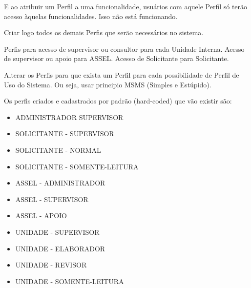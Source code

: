 E ao atribuir um Perfil a uma funcionalidade, usuários com aquele Perfil só terão acesso àquelas funcionalidades. Isso não está funcionando.

Criar logo todos os demais Perfis que serão necessários no sistema.

Perfis para acesso de supervisor ou consultor para cada Unidade Interna. Acesso de supervisor ou apoio para ASSEL. Acesso de Solicitante para Solicitante.



Alterar os Perfis para que exista um Perfil para cada possibilidade de Perfil de Uso do Sistema. Ou seja, usar principio MSMS (Simples e Estúpido).

Os perfis criados e cadastrados por padrão (hard-coded) que vão existir são:

\begin{itemize}
	\item ADMINISTRADOR SUPERVISOR
	
	\item  SOLICITANTE - SUPERVISOR
	\item  SOLICITANTE - NORMAL
	\item  SOLICITANTE - SOMENTE-LEITURA
	
	\item  ASSEL - ADMINISTRADOR
	\item  ASSEL - SUPERVISOR
	\item  ASSEL - APOIO
	
	\item  UNIDADE - SUPERVISOR
	\item  UNIDADE - ELABORADOR
	\item  UNIDADE - REVISOR
	\item  UNIDADE - SOMENTE-LEITURA
\end{itemize}


